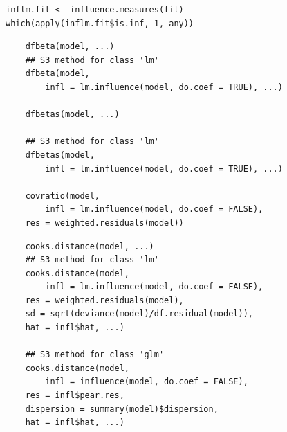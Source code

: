 \documentclass[residuals.tex]{subfiles}
\begin{document}
\begin{verbatim}
inflm.fit <- influence.measures(fit)
which(apply(inflm.fit$is.inf, 1, any))
\end{verbatim}
\newpage


\begin{framed}
	\begin{verbatim}
	dfbeta(model, ...)
	## S3 method for class 'lm'
	dfbeta(model, 
		infl = lm.influence(model, do.coef = TRUE), ...)
	
	dfbetas(model, ...)
	
	## S3 method for class 'lm'
	dfbetas(model, 
		infl = lm.influence(model, do.coef = TRUE), ...)
	
	covratio(model, 
		infl = lm.influence(model, do.coef = FALSE),
	res = weighted.residuals(model))
	\end{verbatim}
\end{framed}

\begin{framed}
	\begin{verbatim}
	cooks.distance(model, ...)
	## S3 method for class 'lm'
	cooks.distance(model, 
		infl = lm.influence(model, do.coef = FALSE),
	res = weighted.residuals(model),
	sd = sqrt(deviance(model)/df.residual(model)),
	hat = infl$hat, ...)
	
	## S3 method for class 'glm'
	cooks.distance(model, 
		infl = influence(model, do.coef = FALSE),
	res = infl$pear.res,
	dispersion = summary(model)$dispersion,
	hat = infl$hat, ...)
	\end{verbatim}
\end{framed}
\end{document}
